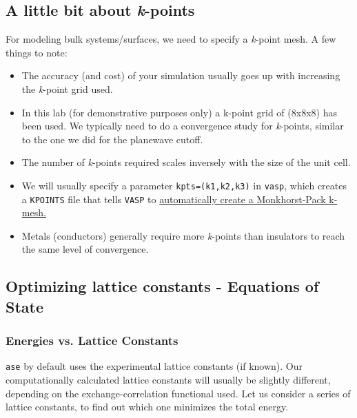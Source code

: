 \documentclass[11pt]{article}
\begin{document}
\subsection{A little bit about \emph{k}-points}
\label{sec:orgc6193d4}

For modeling bulk systems/surfaces, we need to specify a \emph{k}-point mesh. A few things to note:

\begin{itemize}
\item The accuracy (and cost) of your simulation usually goes up with increasing the \emph{k}-point grid used.

\item In this lab (for demonstrative purposes only) a k-point grid of (8x8x8) has been used. We typically need to do a convergence study for \emph{k}-points, similar to the one we did for the planewave cutoff.

\item The number of \emph{k}-points required scales inversely with the size of the unit cell.

\item We will usually specify a parameter \texttt{kpts=(k1,k2,k3)} in \texttt{vasp}, which creates a \texttt{KPOINTS} file that tells \texttt{VASP} to \href{http://cms.mpi.univie.ac.at/vasp/vasp/Automatic\_k\_mesh\_generation.html}{automatically create a Monkhorst-Pack k-mesh.}

\item Metals (conductors) generally require more \emph{k}-points than insulators to reach the same level of convergence.
\end{itemize}

\subsection{Optimizing lattice constants - Equations of State}
\label{sec:org48e7e1b}

\subsubsection{Energies vs. Lattice Constants}
\label{sec:org66d6f3b}

\texttt{ase} by default uses the experimental lattice constants (if known). Our computationally calculated lattice constants will usually be slightly different, depending on the exchange-correlation functional used. Let us consider a series of lattice constants, to find out which one minimizes the total energy.
\end{document}
